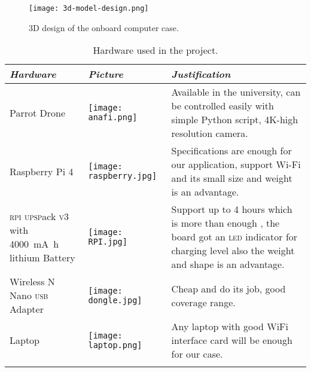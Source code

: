 \documentclass[../main.tex]{subfiles}
\begin{document}
\begin{figure}[tbp]
	\centering
	\texttt{[image: 3d-model-design.png]}
	\caption{3D design of the onboard computer case.}
	\label{fig:3d-design}
\end{figure}


\begin{table}[p]
	\centering
	\caption{Hardware used in the project.}
	\label{tab:hardware-used}  
	\begin{tabular}{ p{4cm} p{3cm} p{6cm} }
		\toprule
		\textit{Hardware} 
		& \textit{Picture} 
		& \textit{Justification} \\ 
		
		\midrule
		
		Parrot \anafi Drone  
		& \begin{minipage}{.1\textwidth}
			\texttt{[image: anafi.png]}
		\end{minipage} 
		& Available in the university, can be 
		controlled easily 
		with simple Python script, 
		4K-high resolution camera.  \\ 
		\addlinespace
		
		Raspberry Pi 4  
		& \begin{minipage}{.0\textwidth}
			\texttt{[image: raspberry.jpg]}
		\end{minipage} 
		& Specifications are enough for our 
		application, support Wi-Fi and its 
		small size and weight is an advantage.\\ 
		\addlinespace
		
		\textsc{rpi} \textsc{upsp}ack \textsc{v}3 with 
		\SI{4000}{\milli\ampere\hour} 
		lithium Battery  
		& \begin{minipage}{.1\textwidth}
			\texttt{[image: RPI.jpg]}
		\end{minipage}  
		& Support up to 4 hours which is more 
		than enough , the board got an \textsc{led} 
		indicator for charging level also the 
		weight and shape is an advantage.  \\ 
		\addlinespace
		
		Wireless N Nano \textsc{usb} Adapter  
		& \begin{minipage}{.1\textwidth}
			\texttt{[image: dongle.jpg]}
		\end{minipage} 
		& Cheap and do its job, good coverage 
		range.  \\ 
		\addlinespace
		
		Laptop 
		& \begin{minipage}{.1\textwidth}
			\texttt{[image: laptop.png]}
		\end{minipage} 
		& Any laptop with good WiFi interface 
		card will be enough for our case. \\ 
		\addlinespace
		
		\bottomrule
	\end{tabular}
\end{table}
\end{document}
